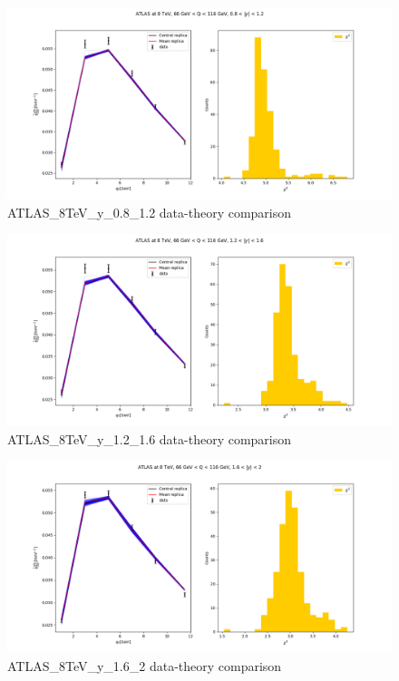 \documentclass[
]{article}
\begin{document}
\begin{figure}
\centering
\includegraphics{pngplots/ATLAS_8TeV_y_0.8_1.2.png}
\caption{ATLAS\_8TeV\_y\_0.8\_1.2 data-theory comparison}
\end{figure}

\begin{figure}
\centering
\includegraphics{pngplots/ATLAS_8TeV_y_1.2_1.6.png}
\caption{ATLAS\_8TeV\_y\_1.2\_1.6 data-theory comparison}
\end{figure}

\begin{figure}
\centering
\includegraphics{pngplots/ATLAS_8TeV_y_1.6_2.png}
\caption{ATLAS\_8TeV\_y\_1.6\_2 data-theory comparison}
\end{figure}
\end{document}
